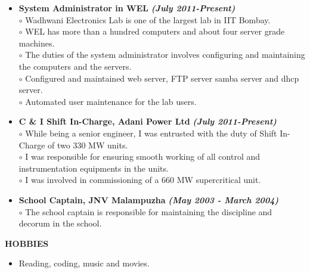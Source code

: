 \documentclass[a4paper,10pt]{article}
\begin{document}
 \begin{itemize}
 \setlength{\itemsep}{1pt}
 \item \textbf{System Administrator in WEL} \textbf \emph{(July 2011-Present)} \\
$\circ$ Wadhwani Electronics Lab is one of the largest lab in IIT Bombay. \\
$\circ$ WEL has more than a hundred computers and about four server grade machines. \\ 
$\circ$ The duties of the system administrator involves configuring and maintaining the computers and the servers. \\
$\circ$ Configured and maintained web server, FTP server samba server and dhcp server. \\
$\circ$ Automated user maintenance for the lab users.

\item \textbf{C \& I Shift In-Charge, Adani Power Ltd} \textbf \emph{(July 2011-Present)} \\
$\circ$ While being a senior engineer, I was entrusted with the duty of Shift In-Charge of two 330 MW units. \\
$\circ$ I was responsible for ensuring smooth working of all control and instrumentation equipments in the units. \\
$\circ$ I was involved in commissioning of a 660 MW supercritical unit.

\item \textbf{School Captain, JNV Malampuzha} \textbf \emph{(May 2003 - March 2004)} \\
$\circ$ The school captain is responsible for maintaining the discipline and decorum in the school.
 \end{itemize}

 \colorbox{titleColor}{\parbox{6.5in}{\textbf{HOBBIES}}}

  \begin{itemize}
 \setlength{\itemsep}{1pt}
    \item Reading, coding, music and movies.
  \end{itemize}
\end{document}
